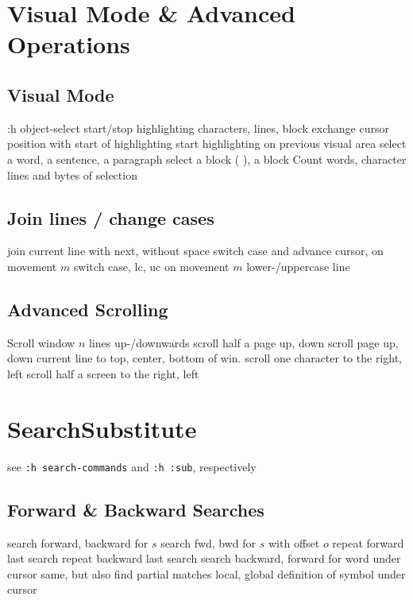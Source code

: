 \section{Visual Mode \& Advanced Operations}{}
\subsection{Visual Mode}	{:h object-select}
	{start/stop highlighting characters, lines, block}
	{exchange cursor position with start of highlighting}
	{start highlighting on previous visual area}
	{select a word, a sentence, a paragraph}
	{select a block ( ), a block {\tt\lapos}	{\tt\rapos}}
	{Count words, character lines and bytes of selection}

\subsection{Join lines / change cases}{}
	{join current line with next, without space}
	{switch case and advance cursor, on movement $m$ }
	{switch case, lc, uc on movement $m$}
	{lower-/uppercase line}

\subsection{Advanced Scrolling}	{}
	{Scroll window $n$ lines up-/downwards}
	{scroll half a page up, down}
	{scroll page up, down}
	{current line to top, center, bottom of win.}
	{scroll one character to the right, left}
	{scroll half a screen to the right, left}

\section{Search\or Substitute}	{see {\tt :h search-commands} and {\tt :h :sub}, respectively}
\subsection{Forward \& Backward Searches}	{}
	{search forward, backward for $s$}
	{search fwd, bwd for $s$ with offset $o$}
	{repeat forward last search}
	{repeat backward last search}
\cmdS{\# * }	{search backward, forward for word under cursor}
	{same, but also find partial matches}
	{local, global definition of symbol under cursor}

